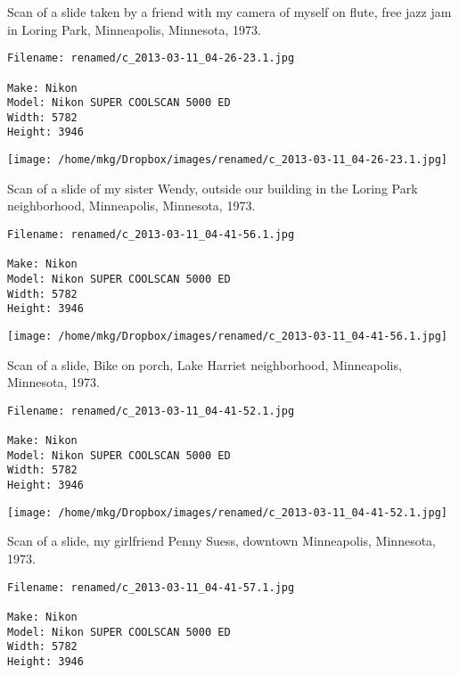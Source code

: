 \noindent Scan of a slide taken by a friend with my camera of myself on flute, free jazz jam in Loring Park, Minneapolis, Minnesota, 1973.
\begin{lstlisting}
Filename: renamed/c_2013-03-11_04-26-23.1.jpg

Make: Nikon
Model: Nikon SUPER COOLSCAN 5000 ED
Width: 5782
Height: 3946
\end{lstlisting}

\begin{landscape}

\texttt{[image: /home/mkg/Dropbox/images/renamed/c\_2013-03-11\_04-26-23.1.jpg]}
\end{landscape}



\noindent Scan of a slide of my sister Wendy, outside our building in the Loring Park neighborhood, Minneapolis, Minnesota, 1973.
\begin{lstlisting}
Filename: renamed/c_2013-03-11_04-41-56.1.jpg

Make: Nikon
Model: Nikon SUPER COOLSCAN 5000 ED
Width: 5782
Height: 3946
\end{lstlisting}

\begin{landscape}

\texttt{[image: /home/mkg/Dropbox/images/renamed/c\_2013-03-11\_04-41-56.1.jpg]}
\end{landscape}



\noindent Scan of a slide, Bike on porch, Lake Harriet neighborhood, Minneapolis, Minnesota, 1973.
\begin{lstlisting}
Filename: renamed/c_2013-03-11_04-41-52.1.jpg

Make: Nikon
Model: Nikon SUPER COOLSCAN 5000 ED
Width: 5782
Height: 3946
\end{lstlisting}

\begin{landscape}

\texttt{[image: /home/mkg/Dropbox/images/renamed/c\_2013-03-11\_04-41-52.1.jpg]}
\end{landscape}



\noindent Scan of a slide, my girlfriend Penny Suess, downtown Minneapolis, Minnesota, 1973.
\begin{lstlisting}
Filename: renamed/c_2013-03-11_04-41-57.1.jpg

Make: Nikon
Model: Nikon SUPER COOLSCAN 5000 ED
Width: 5782
Height: 3946
\end{lstlisting}

